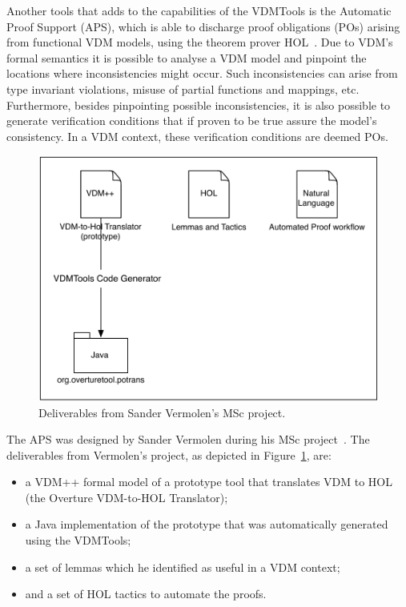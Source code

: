 \documentclass[]{article}
\begin{document}
Another tools that adds to the capabilities of the VDMTools is the Automatic Proof Support (APS), which is able to discharge proof obligations (POs) arising from functional VDM models, using the theorem prover HOL~\cite{DBLP:conf/tphol/Gordon91}.
Due to VDM's formal semantics it is possible to analyse a VDM model and pinpoint the locations where inconsistencies might occur.
Such inconsistencies can arise from type invariant violations, misuse of partial functions and mappings, etc.
Furthermore, besides pinpointing possible inconsistencies, it is also possible to generate verification conditions that if proven to be true assure the model's consistency.
In a VDM context, these verification conditions are deemed POs.

\begin{figure}
  \begin{center}
    \includegraphics[width=.6\textwidth]{images/vermolen_contribution.pdf}
    \caption[Vermolen's contribution]{Deliverables from Sander Vermolen's MSc project.}
    \label{fig:sander_deliverables}
  \end{center}
\end{figure}

The APS was designed by Sander Vermolen during his MSc project~\cite{Vermolen07}.
The deliverables from Vermolen's project, as depicted in Figure~\ref{fig:sander_deliverables}, are:
\begin{itemize}
  \item a VDM++ formal model of a prototype tool that translates VDM to HOL (the Overture VDM-to-HOL Translator);
  \item a Java implementation of the prototype that was automatically generated using the VDMTools;
  \item a set of lemmas which he identified as useful in a VDM context;
  \item and a set of HOL tactics to automate the proofs.
\end{itemize}
\end{document}

